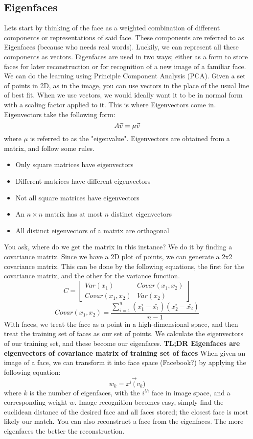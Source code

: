 \subsection{Eigenfaces}
Lets start by thinking of the face as a weighted combination of different components or representations of said face. These components are referred to as Eigenfaces (because who needs real words). Luckily, we can represent all these components as vectors. Eigenfaces are used in two ways; either as a form to store faces for later reconstruction or for recognition of a new image of a familiar face. We can do the learning using Principle Component Analysis (PCA).\newline
Given a set of points in 2D, as in the image, you can use vectors in the place of the usual line of best fit. When we use vectors, we would ideally want it to be in normal form with a scaling factor applied to it. This is where Eigenvectors come in. Eigenvectors take the following form: \[\boldmath{A}\vec{v} = \mu\vec{v}\] where $\mu$ is referred to as the "eigenvalue". Eigenvectors are obtained from a matrix, and follow some rules.
\begin{itemize}
	\item Only square matrices have eigenvectors
	\item Different matrices have different eigenvectors
	\item Not all square matrices have eigenvectors
	\item An $n \times n$ matrix has at most $n$ distinct eigenvectors
	\item All distinct eigenvectors of a matrix are orthogonal
\end{itemize}
You ask, where do we get the matrix in this instance? We do it by finding a covariance matrix. Since we have a 2D plot of points, we can generate a 2x2 covariance matrix. This can be done by the following equations, the first for the covariance matrix, and the other for the variance function.
\[	C = \begin{bmatrix}
Var(x_1) & Covar(x_1, x_2) \\
Covar(x_1,x_2) & Var(x_2)
\end{bmatrix}\]
\[ Covar(x_1, x_2) = \frac{\sum_{i=1}^{n}(x_1^i - \bar{x_1})(x_2^i - \bar{x_2})}{n-1}\]
With faces, we treat the face as a point in a high-dimensional space, and then treat the training set of faces as our set of points. We calculate the eigenvectors of our training set, and these become our eigenfaces. \textbf{TL;DR Eigenfaces are eigenvectors of covariance matrix of training set of faces}\newline
When given an image of a face, we can transform it into face space (Facebook?) by applying the following equation: \[w_k = x^i\vec(v_k)\] where $k$ is the number of eigenfaces, with the $i^{th}$ face in image space, and a corresponding weight $w$. Image recognition becomes easy, simply find the euclidean distance of the desired face and all faces stored; the closest face is most likely our match. You can also reconstruct a face from the eigenfaces. The more eigenfaces the better the reconstruction.
